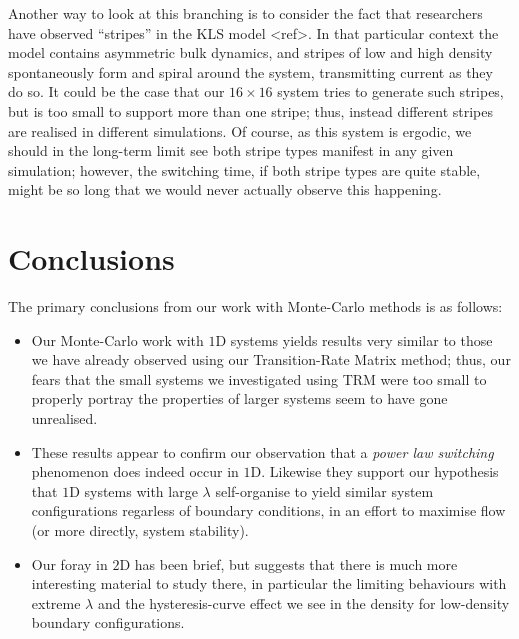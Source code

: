 Another way to look at this branching is to consider the fact that researchers have observed 
``stripes'' in the KLS model <ref>. In that particular context the model contains asymmetric
bulk dynamics, and stripes of low and high density spontaneously form and spiral around the 
system, transmitting current as they do so. It could be the case that our $16 \times 16$ system
tries to generate such stripes, but is too small to support more than one stripe; thus, instead
different stripes are realised in different simulations. Of course, as this system is ergodic, we
should in the long-term limit see both stripe types manifest in any given simulation; however,
the switching time, if both stripe types are quite stable, might be so long that we would never
actually observe this happening.

\section{Conclusions}
The primary conclusions from our work with Monte-Carlo methods is as follows:
\begin{itemize}
 \item Our Monte-Carlo work with $1$D systems yields results very similar to those we 
 have already observed using our Transition-Rate Matrix method; thus, our fears that the small
 systems we investigated using TRM were too small to properly portray the properties of larger
 systems seem to have gone unrealised.
 \item These results appear to confirm our observation that a \textit{power law 
 switching} phenomenon does indeed occur in $1$D. Likewise they support our hypothesis that
 $1$D systems with large $\lambda$ self-organise to yield similar system configurations
 regarless of boundary conditions, in an effort to maximise flow (or more directly, system
 stability).
 \item Our foray in $2$D has been brief, but suggests that there is much more interesting material to study there, in particular the limiting behaviours with extreme $\lambda$
 and the hysteresis-curve effect we see in the density for low-density boundary configurations.
\end{itemize}




